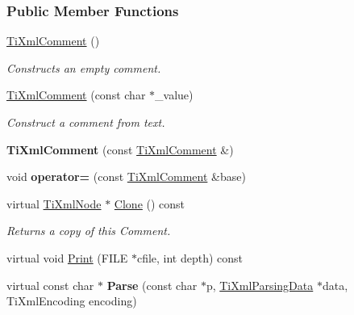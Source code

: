 \subsubsection*{Public Member Functions}
\begin{DoxyCompactItemize}
\item 
\hypertarget{class_ti_xml_comment_aaa3252031d3e8bd3a2bf51a1c61201b7}{
\hyperlink{class_ti_xml_comment_aaa3252031d3e8bd3a2bf51a1c61201b7}{TiXmlComment} ()}
\label{class_ti_xml_comment_aaa3252031d3e8bd3a2bf51a1c61201b7}

\begin{DoxyCompactList}\small\item\em Constructs an empty comment. \item\end{DoxyCompactList}\item 
\hypertarget{class_ti_xml_comment_a37e7802ef17bc03ebe5ae79bf0713d47}{
\hyperlink{class_ti_xml_comment_a37e7802ef17bc03ebe5ae79bf0713d47}{TiXmlComment} (const char $\ast$\_\-value)}
\label{class_ti_xml_comment_a37e7802ef17bc03ebe5ae79bf0713d47}

\begin{DoxyCompactList}\small\item\em Construct a comment from text. \item\end{DoxyCompactList}\item 
\hypertarget{class_ti_xml_comment_afaec41ac2760ce946ba1590eb5708e50}{
{\bfseries TiXmlComment} (const \hyperlink{class_ti_xml_comment}{TiXmlComment} \&)}
\label{class_ti_xml_comment_afaec41ac2760ce946ba1590eb5708e50}

\item 
\hypertarget{class_ti_xml_comment_a46373f99b65cb960637dccb1f126bd49}{
void {\bfseries operator=} (const \hyperlink{class_ti_xml_comment}{TiXmlComment} \&base)}
\label{class_ti_xml_comment_a46373f99b65cb960637dccb1f126bd49}

\item 
\hypertarget{class_ti_xml_comment_a4f6590c9c9a2b63a48972655b78eb853}{
virtual \hyperlink{class_ti_xml_node}{TiXmlNode} $\ast$ \hyperlink{class_ti_xml_comment_a4f6590c9c9a2b63a48972655b78eb853}{Clone} () const }
\label{class_ti_xml_comment_a4f6590c9c9a2b63a48972655b78eb853}

\begin{DoxyCompactList}\small\item\em Returns a copy of this Comment. \item\end{DoxyCompactList}\item 
virtual void \hyperlink{class_ti_xml_comment_a17398061d62c470f57801ce28fa33ad4}{Print} (FILE $\ast$cfile, int depth) const 
\item 
\hypertarget{class_ti_xml_comment_a43bddc18ac057734b41d84653b71d3e0}{
virtual const char $\ast$ {\bfseries Parse} (const char $\ast$p, \hyperlink{class_ti_xml_parsing_data}{TiXmlParsingData} $\ast$data, TiXmlEncoding encoding)}
\label{class_ti_xml_comment_a43bddc18ac057734b41d84653b71d3e0}


\end{DoxyCompactItemize}
